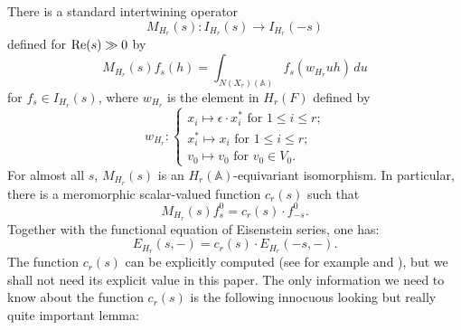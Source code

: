 \documentclass[10pt]{amsart}
\theoremstyle{plain}
\numberwithin{equation}{section}
\begin{document}
 \vskip 5pt

There is a standard intertwining operator 
  \[  
M_{H_r}(s) :  I_{H_r}(s) \longrightarrow I_{H_r}(-s) 
\]
defined for ${\rm Re}(s) \gg 0$ by
\[  
M_{H_r}(s) f_s(h) = \int_{N(X_r)({\mathbb{A}})} f_s(w_{H_r} u h) \, du 
\]
for $f_s\in I_{H_r}(s)$,
 where $w_{H_r}$ is the element in $H_r(F)$ defined by
  \[  
w_{H_r} :  \begin{cases}
  x_i \mapsto \epsilon \cdot x_i^* \text{  for $1 \leq i \leq r$;}  \\
  x_i^*  \mapsto  x_i \text{  for $1\leq i \leq r$;} \\
  v_0 \mapsto v_0  \text{  for $v_0 \in V_0$.} \end{cases} 
\]
  For almost all $s$, $M_{H_r}(s)$ is an $H_r({\mathbb{A}})$-equivariant
  isomorphism. In particular, there is a meromorphic scalar-valued
  function $c_r(s)$ such that
  \[   
M_{H_r}(s) f^0_s  = c_r(s) \cdot f^0_{-s}.  
\]
 Together with the functional equation of Eisenstein series, one has:
 \begin{equation}\label{E:spherical_functional_equation}
E_{H_r}(s, -)  = c_r(s) \cdot E_{H_r}(-s,-) . 
\end{equation}
The function $c_r(s)$ can be explicitly computed (see for example
\cite[\S 9]{Ik} and \cite[\S 9]{I2}), but we shall not need its
explicit value in this paper. The only information we need to know
about the function $c_r(s)$ is the following innocuous looking but
really quite important lemma:
\vskip 5pt
\end{document}
